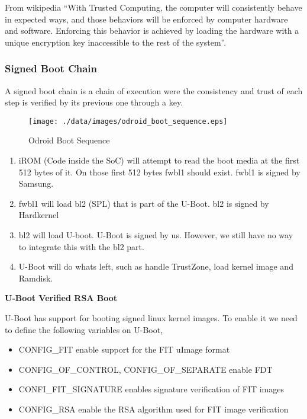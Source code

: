 From wikipedia \cite{wiki:trustedComputing} ``With Trusted Computing, the computer will consistently behave in expected ways, and those behaviors will be enforced by computer hardware and software. Enforcing this behavior is achieved by loading the hardware with a unique encryption key inaccessible to the rest of the system''.
\subsubsection{Signed Boot Chain}

A signed boot chain is a chain of execution were the consistency and trust of each step is verified by its previous one through a key.

\begin{figure}[h]
\texttt{[image: ./data/images/odroid\_boot\_sequence.eps]}
\caption{Odroid Boot Sequence}
\end{figure}

\begin{enumerate}
 \item iROM (Code inside the SoC) will attempt to read the boot media at the first 512 bytes of it. On those first 512 bytes fwbl1 should exist. fwbl1 is signed by Samsung.
 \item fwbl1 will load bl2 (SPL) that is part of the U-Boot. bl2 is signed by Hardkernel
 \item bl2 will load U-boot. U-Boot is signed by us. However, we still have no way to integrate this with the bl2 part.
 \item U-Boot will do whats left, such as handle TrustZone, load kernel image and Ramdisk.
\end{enumerate}

\noindent
\textbf{U-Boot Verified RSA Boot \tobetested{}}

U-Boot has support for booting signed linux kernel images. To enable it we need to define the following variables on U-Boot,

\begin{itemize}
 \item CONFIG\_FIT  enable support for the FIT uImage format
 \item CONFIG\_OF\_CONTROL, CONFIG\_OF\_SEPARATE enable FDT
 \item CONFI\_FIT\_SIGNATURE enables signature verification of FIT images
 \item CONFIG\_RSA enable the RSA algorithm used for FIT image verification
\end{itemize}


